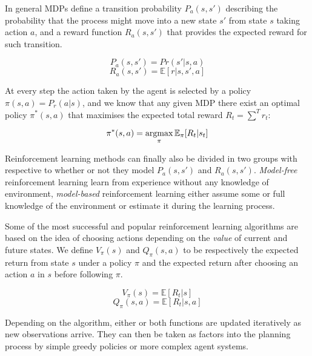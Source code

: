 In general MDPs define a transition probability $P_a(s, s')$ describing the
probability that the process might move into a new state $s'$ from state $s$
taking action $a$, and a reward function $R_a(s, s')$ that provides the expected
reward for such transition.

\begin{equation}
P_a(s, s') = Pr(s' | s, a)
\end{equation}
\begin{equation}
R_a(s, s') = \mathbb{E}[r|s, s', a]
\end{equation}

At every step the action taken by the agent is selected by a policy $\pi(s, a) =
P_r(a | s)$, and we know that any given MDP there exist an optimal policy
$\pi^*(s, a)$ that maximises the expected total reward $R_t = \sum^T{r_t}$:

\begin{equation}
  \pi^*(s, a) = \operatornamewithlimits{argmax}_{\pi} \mathbb{E}_{\pi}[R_t | s_t]
\end{equation}

Reinforcement learning methods can finally also be divided in two groups with
respective to whether or not they model $P_a(s, s')$ and $R_a(s, s')$.
\emph{Model-free} reinforcement learning learn from experience without any
knowledge of environment, \emph{model-based} reinforcement learning either
assume some or full knowledge of the environment or estimate it during the
learning process.

Some of the most successful and popular reinforcement learning algorithms are
based on the idea of choosing actions depending on the \emph{value} of current
and future states. We define $V_{\pi}(s)$ and $Q_{\pi}(s, a)$ to be respectively
the expected return from state $s$ under a policy $\pi$ and the expected return
after choosing an action $a$ in $s$ before following $\pi$.

\begin{equation}
V_{\pi}(s) = \mathbb{E}[R_t | s]
\end{equation}
\begin{equation}
Q_{\pi}(s, a) = \mathbb{E}[R_t | s, a]
\end{equation}

Depending on the algorithm, either or both functions are updated iteratively as
new observations arrive. They can then be taken as factors into the planning
process by simple greedy policies or more complex agent systems.


